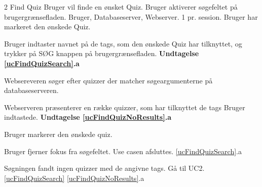 \uchead
	{2}
	{Find Quiz}
	{Bruger vil finde en ønsket Quiz.}
	{Bruger aktiverer søgefeltet på brugergrænsefladen.}
	{Bruger, Databaseserver, Webserver.}
	{}
	{1 pr. session.}
	{Bruger har markeret den ønskede Quiz.}

\item \label{ucFindQuizSearch} Bruger indtaster navnet på de tags, som den ønskede Quiz har tilknyttet, og trykker på SØG knappen på brugergrænsefladen. 
\textbf{Undtagelse \ref{ucFindQuizSearch}.a}

\item Websereveren søger efter quizzer der matcher søgeargumenterne på databaseserveren.

\item \label{ucFindQuizNoResults} Webserveren præsenterer en række quizzer, som har tilknyttet de tags Bruger indtastede.
\textbf{Undtagelse \ref{ucFindQuizNoResults}.a}

\item Bruger markerer den ønskede quiz.

\ucdescriptionend

\ucextension
	{Bruger fjerner fokus fra søgefeltet.}
	{Use casen afsluttes.}
	{\ref{ucFindQuizSearch}.a}

\ucextension
	{Søgningen fandt ingen quizzer med de angivne tags.}
	{Gå til UC2.\ref{ucFindQuizSearch}}
	{\ref{ucFindQuizNoResults}.a}
				
